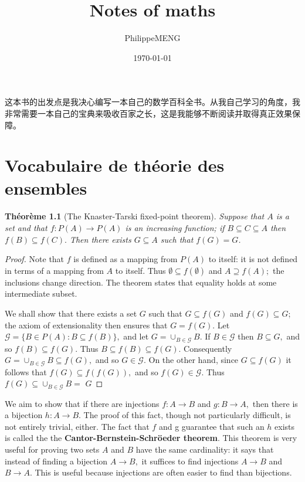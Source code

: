 \documentclass[12pt]{book}
\title{Notes of maths}
\author{PhilippeMENG}
\date{\today}
\theoremstyle{definition}\newtheorem{dfn}{Définition}[chapter]
\theoremstyle{plain}\newtheorem{thm}{Théorème}[chapter]
\theoremstyle{plain}\newtheorem{prp}{Proposition}[chapter]
\theoremstyle{plain}\newtheorem{lem}{\bf Lemme}[chapter]
\theoremstyle{plain}\newtheorem{axm}{\bf Axiome}[chapter]
\theoremstyle{plain}\newtheorem{lmm}{\bf Lemme}[chapter]
\theoremstyle{plain}\newtheorem{cor}{\bf Corollaire}[chapter]
\theoremstyle{remark}\newtheorem{rem}{Remarque}[chapter]
\begin{document}
\maketitle
\tableofcontents
\frontmatter
这本书的出发点是我决心编写一本自己的数学百科全书。从我自己学习的角度，我非常需要一本自己的宝典来吸收百家之长，这是我能够不断阅读并取得真正效果保障。
\mainmatter

        \chapter{Vocabulaire de théorie des ensembles}

\begin{thm}[The Knaster-Tarski fixed-point theorem]
 Suppose that $A$ is a set and that $f: P(A) \rightarrow P(A)$ is an increasing function; if $B \subseteq C \subseteq A$ then $f(B) \subseteq f(C) .$ Then there exists $G \subseteq A$ such that $f(G)=G$.
\end{thm}

\begin{proof}
	Note that $f$ is defined as a mapping from $P(A)$ to itself: it is not defined in terms of a mapping from $A$ to itself. Thus $\emptyset \subseteq f(\emptyset)$ and $A \supseteq f(A) ;$ the inclusions change direction. The theorem states that equality holds at some intermediate subset.
	
	We shall show that there exists a set $G$ such that $G \subseteq f(G)$ and $f(G) \subseteq G$; the axiom of extensionality then ensures that $G=f(G)$. Let $\mathcal{G}=\{B \in P(A): B \subseteq f(B)\},$ and let $G=\cup_{B \in \mathcal{G}} B .$ If $B \in \mathcal{G}$
	then $B \subseteq G,$ and so $f(B) \subseteq f(G) .$ Thus $B \subseteq f(B) \subseteq f(G) .$ Consequently $G=\cup_{B \in \mathcal{G}} B \subseteq f(G),$ and so $G \in \mathcal{G} .$ On the other hand, since $G \subseteq f(G)$
	it follows that $f(G) \subseteq f(f(G)),$ and so $f(G) \in \mathcal{G} .$ Thus $f(G) \subseteq \cup_{B \in \mathcal{G}} B=$
	$G$

\end{proof}









We aim to show that if there are injections $f: A \rightarrow B$ and
$g: B \rightarrow A,$ then there is a bijection $h: A \rightarrow B .$
The proof of this fact, though not particularly difficult, is not
entirely trivial, either. The fact that $f$ and g guarantee that such
an $h$ exists is called the the {\bf Cantor-Bernstein-Schröeder theorem}. This theorem is very useful for proving two sets $A$ and $B$ have the same cardinality: it says that instead of finding a bijection $A \rightarrow B,$ it suffices to find injections $A \rightarrow B$ and $B \rightarrow A$. This is useful because injections are often easier to find than bijections.
\end{document}
